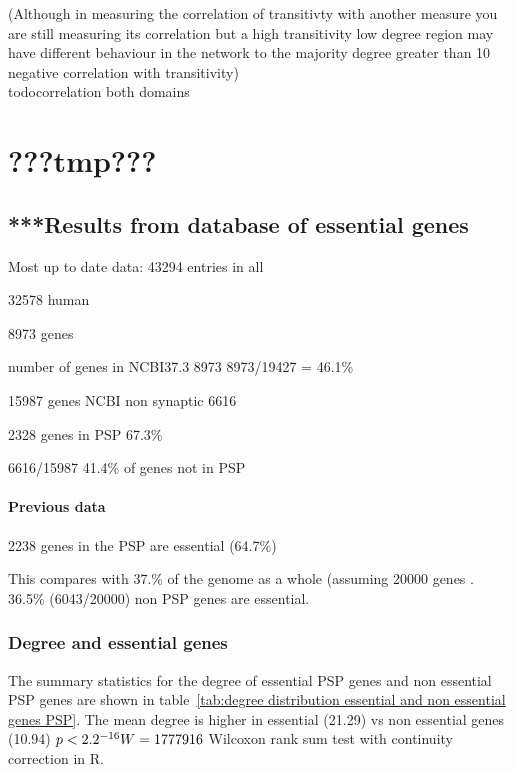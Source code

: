 (Although in measuring the correlation of transitivty with another measure you are still measuring its correlation but a high transitivity low degree region may have different behaviour in the network to the majority degree greater than 10 negative correlation with transitivity)\\todo{correlation both domains}

\section{???tmp???}
 \subsection{***Results from database of essential genes}
 Most up to date data:
43294 entries in all

32578 human 

8973 genes

number of genes in NCBI37.3 8973
8973/19427 = 46.1\%

15987 genes NCBI non synaptic
6616

2328 genes in PSP 67.3\%

6616/15987 41.4\% of genes not in PSP










   


\paragraph{Previous data}
2238 genes in the PSP are essential (64.7\%)

This compares with 37.\% of the genome as a whole (assuming 20000 genes . 36.5\% (6043/20000) non PSP genes are essential. 

\subsubsection{Degree and essential genes}

The summary statistics for the degree of essential PSP genes and non essential PSP genes are shown in table~\ref{tab:degree distribution essential and non essential genes PSP}. The mean degree is higher in essential (21.29) vs non essential genes (10.94) $p<2.2 \time 10^{-16}   W=1777916$ Wilcoxon rank sum test with continuity correction in R.

